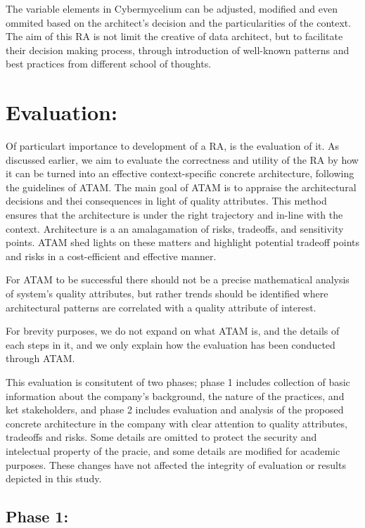 \documentclass[review]{elsarticle}
\begin{document}
The variable elements in Cybermycelium can be adjusted, modified and even ommited based on the architect's decision and the particularities of the context. The aim of this RA is not limit the creative of data architect, but to facilitate their decision making process, through introduction of well-known patterns and best practices from different school of thoughts.

\section{Evaluation:}

Of particulart importance to development of a RA, is the evaluation of it. As discussed earlier, we aim to evaluate the correctness and utility of the RA by how it can be turned into an effective context-specific concrete architecture, following the guidelines of ATAM. The main goal of ATAM is to appraise the architectural decisions and thei consequences in light of quality attributes. This method ensures that the architecture is under the right trajectory and in-line with the context. Architecture is a an amalagamation of risks, tradeoffs, and sensitivity points. ATAM shed lights on these matters and highlight potential tradeoff points and risks in a cost-efficient and effective manner. 

For ATAM to be successful there should not be a precise mathematical analysis of system's quality attributes, but rather trends should be identified where architectural patterns are correlated with a quality attribute of interest. 

For brevity purposes, we do not expand on what ATAM is, and the details of each steps in it, and we only explain how the evaluation has been conducted through ATAM. 

This evaluation is consitutent of two phases; phase 1 includes collection of basic information about the company's background, the nature of the practices, and ket stakeholders, and phase 2 includes evaluation and analysis of the proposed concrete architecture in the company with clear attention to quality attributes, tradeoffs and risks. Some details are omitted to protect the security and intelectual property of the pracie, and some details are modified for academic purposes. These changes have not affected the integrity of evaluation or results depicted in this study. 

\subsection{Phase 1:}
\end{document}
